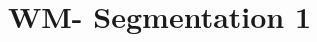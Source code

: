 \documentclass{article}
\begin{document}
\thispagestyle{empty}
\printtitle									%
  	\vfill
\printauthor
\newpage

\tableofcontents
\thispagestyle{empty}
\newpage

\def\BU{WM}
\def\SegmentOne{1}
\newcommand\SegmentsOneComponent{PWM, IS_adjusted, IM_adjusted, AccountLevelFee,
MPAM, HedgeFundRev, OtherIMFee, OtherRevenue,PWMexIM}

\section{\BU - Segmentation 1}
	
	
\CleanUp
\end{document}
